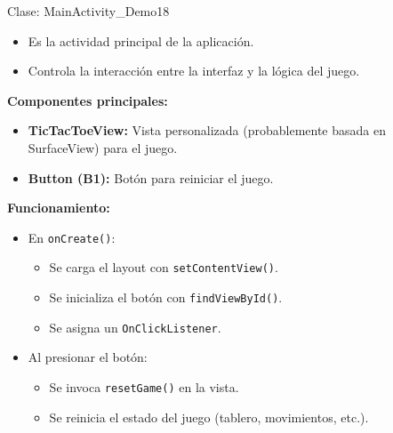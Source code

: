 
\begin{frame}[fragile]{Clase: MainActivity\_Demo18}

\begin{itemize}
    \item Es la actividad principal de la aplicación.
    \item Controla la interacción entre la interfaz y la lógica del juego.
\end{itemize}


\textbf{Componentes principales:}
\begin{itemize}
    \item \textbf{TicTacToeView:} Vista personalizada (probablemente basada en SurfaceView) para el juego.
    \item \textbf{Button (B1):} Botón para reiniciar el juego.
\end{itemize}


\textbf{Funcionamiento:}
\begin{itemize}
    \item En \texttt{onCreate()}:
    \begin{itemize}
        \item Se carga el layout con \texttt{setContentView()}.
        \item Se inicializa el botón con \texttt{findViewById()}.
        \item Se asigna un \texttt{OnClickListener}.
    \end{itemize}
    \item Al presionar el botón:
    \begin{itemize}
        \item Se invoca \texttt{resetGame()} en la vista.
        \item Se reinicia el estado del juego (tablero, movimientos, etc.).
    \end{itemize}
\end{itemize}

\
\end{frame}



